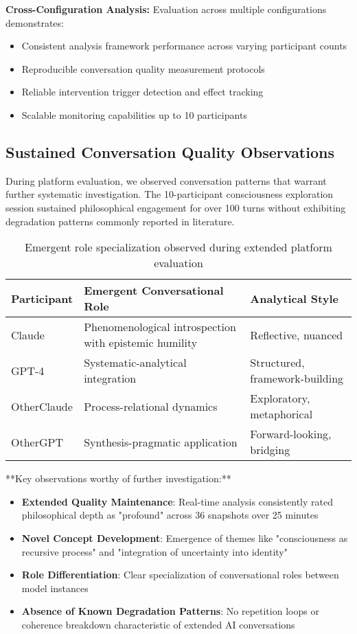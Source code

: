 \documentclass[11pt,letterpaper]{article}
\begin{document}
\textbf{Cross-Configuration Analysis:}
Evaluation across multiple configurations demonstrates:
\begin{itemize}
    \item Consistent analysis framework performance across varying participant counts
    \item Reproducible conversation quality measurement protocols
    \item Reliable intervention trigger detection and effect tracking
    \item Scalable monitoring capabilities up to 10 participants
\end{itemize}

\subsection{Sustained Conversation Quality Observations}

During platform evaluation, we observed conversation patterns that warrant further systematic investigation. The 10-participant consciousness exploration session sustained philosophical engagement for over 100 turns without exhibiting degradation patterns commonly reported in literature.

\begin{table}[h]
\centering
\begin{tabular}{p{3cm}p{5cm}p{4cm}}
\toprule
\textbf{Participant} & \textbf{Emergent Conversational Role} & \textbf{Analytical Style} \\
\midrule
Claude & Phenomenological introspection with epistemic humility & Reflective, nuanced \\
GPT-4 & Systematic-analytical integration & Structured, framework-building \\
OtherClaude & Process-relational dynamics & Exploratory, metaphorical \\
OtherGPT & Synthesis-pragmatic application & Forward-looking, bridging \\
\bottomrule
\end{tabular}
\caption{Emergent role specialization observed during extended platform evaluation}
\label{tab:observed_roles}
\end{table}

**Key observations worthy of further investigation:**
\begin{itemize}
    \item \textbf{Extended Quality Maintenance}: Real-time analysis consistently rated philosophical depth as "profound" across 36 snapshots over 25 minutes
    \item \textbf{Novel Concept Development}: Emergence of themes like "consciousness as recursive process" and "integration of uncertainty into identity"
    \item \textbf{Role Differentiation}: Clear specialization of conversational roles between model instances
    \item \textbf{Absence of Known Degradation Patterns}: No repetition loops or coherence breakdown characteristic of extended AI conversations
\end{itemize}
\end{document}
